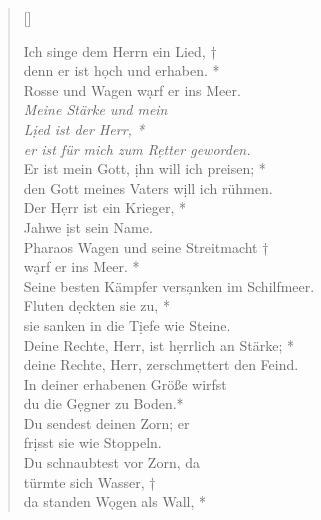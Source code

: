 





\vspace{0.3cm}
\def\greinitialformat#1{{\fontsize{40}{40}\selectfont #1}}
\gresetfirstlineaboveinitial{\small \textcolor{red}{Ex 15}}{}
\setaboveinitialseparation{0.72mm}

\vspace{0.3cm}

\begin{verse}[\versewidth]


Ich singe dem Herrn ein Lied, †\\
denn er ist h\d och und erhaben. *\\ 
Rosse und Wagen w\d arf er ins Meer.\\
\vin \textit{Meine Stärke und mein \\ \vin L\d ied ist der Herr, *\\
\vin er ist für mich zum R\d etter geworden.} \\
Er ist mein Gott, \d ihn will ich preisen; *\\ 
den Gott meines Vaters w\d ill ich rühmen. \\
\vin Der H\d err ist ein Krieger, *\\
\vin Jahwe \d ist sein Name.\\
Pharaos Wagen und seine Streitmacht †\\
w\d arf er ins Meer. *\\ 
Seine besten Kämpfer vers\d anken im Schilfmeer.\\
\vin Fluten d\d eckten sie zu, *\\
\vin sie sanken in die T\d iefe wie Steine.\\
Deine Rechte, Herr, ist h\d errlich an Stärke; *\\
deine Rechte, Herr, zerschm\d ettert den Feind.\\
\vin In deiner erhabenen Größe wirfst \\ \vin du die G\d egner zu Boden.*\\
\vin Du sendest deinen Zorn; er\\ \vin  fr\d isst sie wie Stoppeln.\\
Du schnaubtest vor Zorn, da \\ türmte sich Wasser, †\\
 da standen W\d ogen als Wall, *\\

\end{verse}
